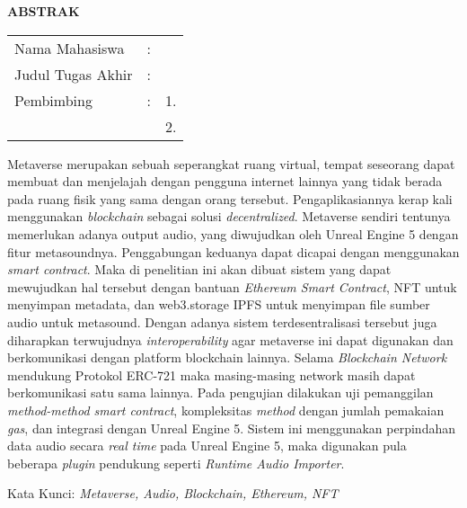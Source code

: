 \begin{center}
  \large\textbf{ABSTRAK}
\end{center}


\vspace{2ex}

\begingroup
\setlength{\tabcolsep}{0pt}

\noindent
\begin{tabularx}{\textwidth}{l >{\centering}m{2em} X}
  Nama Mahasiswa    & : & \name{}         \\

  Judul Tugas Akhir & : & \tatitle{}      \\

  Pembimbing        & : & 1. \advisor{}   \\
                    &   & 2. \coadvisor{} \\
\end{tabularx}
\endgroup

Metaverse merupakan sebuah seperangkat ruang virtual, tempat seseorang dapat membuat dan menjelajah
dengan pengguna internet lainnya yang tidak berada pada ruang fisik yang sama dengan orang tersebut.
Pengaplikasiannya kerap kali menggunakan \emph{blockchain} sebagai solusi \emph{decentralized}. Metaverse sendiri
tentunya memerlukan adanya output audio, yang diwujudkan oleh Unreal Engine 5 dengan fitur metasoundnya.
Penggabungan keduanya dapat dicapai dengan menggunakan \emph{smart contract}. Maka di penelitian ini akan dibuat sistem yang dapat mewujudkan hal tersebut
dengan bantuan \emph{Ethereum Smart Contract}, NFT untuk menyimpan metadata, dan web3.storage IPFS untuk menyimpan file sumber audio untuk metasound.
Dengan adanya sistem terdesentralisasi tersebut juga diharapkan terwujudnya \emph{interoperability} agar metaverse ini dapat digunakan dan berkomunikasi dengan platform
blockchain lainnya. Selama \emph{Blockchain Network} mendukung Protokol ERC-721 maka masing-masing network masih dapat berkomunikasi satu sama lainnya.
Pada pengujian dilakukan uji pemanggilan \emph{method-method smart contract}, kompleksitas \emph{method} dengan jumlah pemakaian \emph{gas}, dan integrasi dengan Unreal Engine 5.
Sistem ini menggunakan perpindahan data audio secara \emph{real time} pada Unreal Engine 5, maka digunakan pula beberapa \emph{plugin} pendukung seperti \emph{Runtime Audio Importer}.

Kata Kunci: \emph{Metaverse, Audio, Blockchain, Ethereum, NFT}

